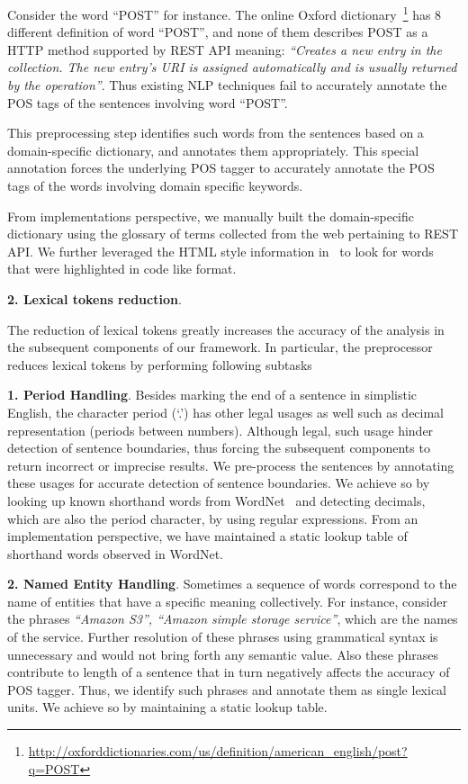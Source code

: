 Consider the word ``POST'' for instance. The online Oxford dictionary~\footnote{\url{http://oxforddictionaries.com/us/definition/american_english/post?q=POST}} has 8 different definition of word ``POST'', and none of them describes POST as a HTTP method supported by REST API meaning: \textit{``Creates a new entry in the collection. The new entry's URI is assigned automatically and is usually returned by the operation''}. Thus existing NLP techniques fail to accurately annotate the POS tags of the sentences involving word ``POST''.  

This preprocessing step identifies such words from the sentences based on a domain-specific dictionary, and annotates them appropriately. This special annotation forces the underlying POS tagger to accurately annotate the POS tags of the words involving domain specific keywords.

From implementations perspective, we manually built the domain-specific dictionary using the glossary of terms collected from the web pertaining to REST API. We further leveraged the HTML style information in \amazon\ to look for words that were highlighted in code like format. 

\textbf{2. Lexical tokens reduction}.

The reduction of lexical tokens greatly increases the accuracy of the analysis in the subsequent components of our framework. In particular, the preprocessor reduces lexical tokens by performing following subtasks

\textbf{1. Period Handling}. Besides marking the end of a sentence in simplistic English, the character period (`.') has other legal usages as well such as decimal representation (periods between numbers). Although legal, such usage hinder detection of sentence boundaries, thus forcing the subsequent components to return incorrect or imprecise results. We pre-process the sentences by annotating these usages for accurate detection of sentence boundaries. We achieve so by looking up known shorthand words from WordNet~\cite{wordnet} and detecting decimals, which are also the period character, by using regular expressions. From an implementation perspective, we have maintained a static lookup table of shorthand words observed in WordNet.
	
\textbf{2. Named Entity Handling}. Sometimes a sequence of words correspond to the name of entities that have a specific meaning collectively. For instance, consider the phrases \textit{``Amazon S3'', ``Amazon simple storage service''}, which are the names of the service. Further resolution of these phrases using grammatical syntax is unnecessary and would not bring forth any semantic value. Also these phrases contribute to length of a sentence that in turn negatively affects the accuracy of POS tagger. Thus, we identify such phrases and annotate them as single lexical units. We achieve so by maintaining a static lookup table.
	
